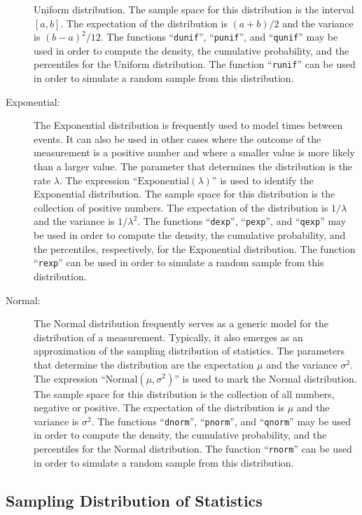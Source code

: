 \documentclass[
]{krantz}
\theoremstyle{definition}
\theoremstyle{definition}
\theoremstyle{definition}
\theoremstyle{remark}
\begin{document}
\begin{description}
Uniform distribution. The sample space for this distribution is the
interval \([a,b]\). The expectation of the distribution is \((a+b)/2\)
and the variance is \((b-a)^2/12\). The functions ``\texttt{dunif}'',
``\texttt{punif}'', and ``\texttt{qunif}'' may be used in order to compute the
density, the cumulative probability, and the percentiles for the
Uniform distribution. The function ``\texttt{runif}'' can be used in order to
simulate a random sample from this distribution.
\item[Exponential:]
The Exponential distribution is frequently used to model times
between events. It can also be used in other cases where the outcome
of the measurement is a positive number and where a smaller value is
more likely than a larger value. The parameter that determines the
distribution is the rate \(\lambda\). The expression
``\(\mathrm{Exponential}(\lambda)\)'' is used to identify the
Exponential distribution. The sample space for this distribution is
the collection of positive numbers. The expectation of the
distribution is \(1/\lambda\) and the variance is \(1/\lambda^2\). The
functions ``\texttt{dexp}'', ``\texttt{pexp}'', and ``\texttt{qexp}'' may be used in order to
compute the density, the cumulative probability, and the
percentiles, respectively, for the Exponential distribution. The
function ``\texttt{rexp}'' can be used in order to simulate a random sample
from this distribution.
\item[Normal:]
The Normal distribution frequently serves as a generic model for the
distribution of a measurement. Typically, it also emerges as an
approximation of the sampling distribution of statistics. The
parameters that determine the distribution are the expectation \(\mu\)
and the variance \(\sigma^2\). The expression
``\(\mathrm{Normal}(\mu,\sigma^2)\)'' is used to mark the Normal
distribution. The sample space for this distribution is the
collection of all numbers, negative or positive. The expectation of
the distribution is \(\mu\) and the variance is \(\sigma^2\). The
functions ``\texttt{dnorm}'', ``\texttt{pnorm}'', and ``\texttt{qnorm}'' may be used in order
to compute the density, the cumulative probability, and the
percentiles for the Normal distribution. The function ``\texttt{rnorm}'' can
be used in order to simulate a random sample from this distribution.
\end{description}

\hypertarget{sampling-distribution-of-statistics}{%
\subsection{Sampling Distribution of Statistics}\label{sampling-distribution-of-statistics}}
\end{document}
